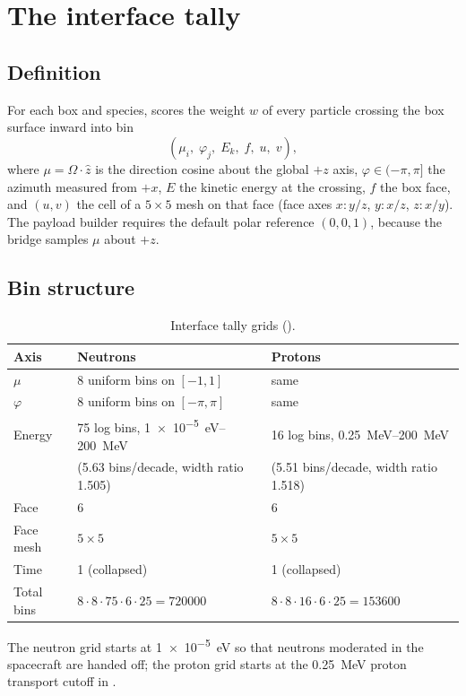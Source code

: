 \section{The interface tally}
\subsection{Definition}
For each box and species, \mcdc{} scores the weight $w$ of every particle crossing the box surface inward into bin
\[
  (\mu_i,\;\varphi_j,\;E_k,\;f,\;u,\;v),
\]
where $\mu=\hat\Omega\cdot\hat z$ is the direction cosine about the global $+z$ axis, $\varphi\in(-\pi,\pi]$ the azimuth measured from $+x$, $E$ the kinetic energy at the crossing, $f$ the box face, and $(u,v)$ the cell of a $5\times5$ mesh on that face (face axes $x\!:\!y/z$, $y\!:\!x/z$, $z\!:\!x/y$). The payload builder requires the default polar reference $(0,0,1)$, because the bridge samples $\mu$ about $+z$.

\subsection{Bin structure}
\begin{table}[h]
\centering
\caption{Interface tally grids ().}
\label{tab:bins}
\begin{tabular}{lll}
\toprule
Axis & Neutrons & Protons \\
\midrule
$\mu$ & 8 uniform bins on $[-1,1]$ & same \\
$\varphi$ & 8 uniform bins on $[-\pi,\pi]$ & same \\
Energy & 75 log bins, \SI{1e-5}{eV}--\SI{200}{MeV} & 16 log bins, \SI{0.25}{MeV}--\SI{200}{MeV} \\
 & (5.63 bins/decade, width ratio 1.505) & (5.51 bins/decade, width ratio 1.518) \\
Face & 6 & 6 \\
Face mesh & $5\times5$ & $5\times5$ \\
Time & 1 (collapsed) & 1 (collapsed) \\
\midrule
Total bins & $8\cdot8\cdot75\cdot6\cdot25 = \num{720000}$ & $8\cdot8\cdot16\cdot6\cdot25 = \num{153600}$ \\
\bottomrule
\end{tabular}
\end{table}
The neutron grid starts at \SI{1e-5}{eV} so that neutrons moderated in the spacecraft are handed off; the proton grid starts at the \SI{0.25}{MeV} proton transport cutoff in \mcdc{}.


